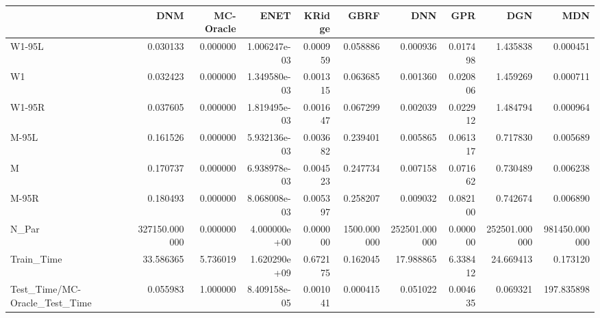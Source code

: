 \begin{tabular}{lrrrrrrrrr}
\toprule
{} &            DNM &  MC-Oracle &          ENET &    KRidge &         GBRF &            DNN &       GPR &            DGN &            MDN \\
\midrule
W1-95L                        &       0.030133 &   0.000000 &  1.006247e-03 &  0.000959 &     0.058886 &       0.000936 &  0.017498 &       1.435838 &       0.000451 \\
W1                            &       0.032423 &   0.000000 &  1.349580e-03 &  0.001315 &     0.063685 &       0.001360 &  0.020806 &       1.459269 &       0.000711 \\
W1-95R                        &       0.037605 &   0.000000 &  1.819495e-03 &  0.001647 &     0.067299 &       0.002039 &  0.022912 &       1.484794 &       0.000964 \\
M-95L                         &       0.161526 &   0.000000 &  5.932136e-03 &  0.003682 &     0.239401 &       0.005865 &  0.061317 &       0.717830 &       0.005689 \\
M                             &       0.170737 &   0.000000 &  6.938978e-03 &  0.004523 &     0.247734 &       0.007158 &  0.071662 &       0.730489 &       0.006238 \\
M-95R                         &       0.180493 &   0.000000 &  8.068008e-03 &  0.005397 &     0.258207 &       0.009032 &  0.082100 &       0.742674 &       0.006890 \\
N\_Par                         &  327150.000000 &   0.000000 &  4.000000e+00 &  0.000000 &  1500.000000 &  252501.000000 &  0.000000 &  252501.000000 &  981450.000000 \\
Train\_Time                    &      33.586365 &   5.736019 &  1.620290e+09 &  0.672175 &     0.162045 &      17.988865 &  6.338412 &      24.669413 &       0.173120 \\
Test\_Time/MC-Oracle\_Test\_Time &       0.055983 &   1.000000 &  8.409158e-05 &  0.001041 &     0.000415 &       0.051022 &  0.004635 &       0.069321 &     197.835898 \\
\bottomrule
\end{tabular}
